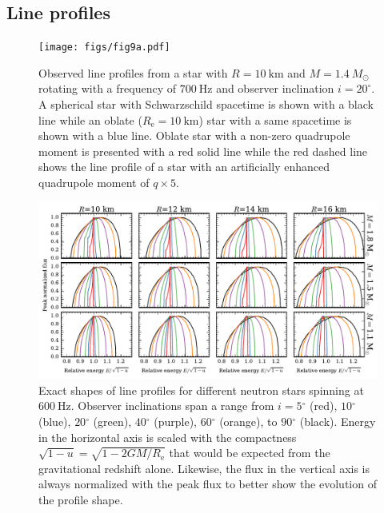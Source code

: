 \documentclass{aa}
\newcommand{\sch}{Schwarzschild }
\newcommand{\Msun}{\ensuremath{M_{\odot}}}
\renewcommand{\deg}{\ensuremath{^{\circ}}}
\begin{document}
\subsection{Line profiles}

\begin{figure}
\texttt{[image: figs/fig9a.pdf]}
\caption{\label{fig:line_profiles}
  Observed line profiles from a star with $R=10~\mathrm{km}$ and $M=1.4~\Msun$ rotating with a frequency of $700~\mathrm{Hz}$ and observer inclination $i = 20^{\circ}$.
  A spherical star with \sch spacetime is shown with a black line while an oblate ($R_{\mathrm{e}}=10~\mathrm{km}$) star with a same spacetime is shown with a blue line.
  Oblate star with a non-zero quadrupole moment is presented with a red solid line while the red dashed line shows the line profile of a star with an artificially enhanced quadrupole moment of $q \times 5$.
  }
\end{figure}



\begin{figure}[htbp!]
\centering
    \includegraphics[width=18cm]{figs/sweep_grid.pdf}
\caption{\label{fig:sweep}
    Exact shapes of line profiles for different neutron stars spinning at $600~\mathrm{Hz}$.
Observer inclinations span a range from $i=5\deg$ (red), $10\deg$ (blue), $20\deg$ (green), $40\deg$ (purple), $60\deg$ (orange), to $90\deg$ (black).
Energy in the horizontal axis is scaled with the compactness $\sqrt{1-u} = \sqrt{1-2GM/R_{\mathrm{e}}}$ that would be expected from the gravitational redshift alone.
Likewise, the flux in the vertical axis is always normalized with the peak flux to better show the evolution of the profile shape.
}
\end{figure}
\end{document}
